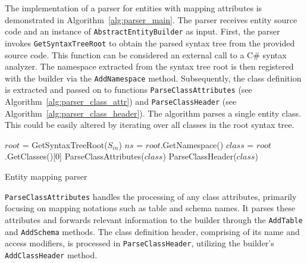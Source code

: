 The implementation of a parser for entities with mapping attributes is demonstrated in Algorithm~\ref{alg:parser_main}. The parser receives entity source code and an instance of \texttt{AbstractEntityBuilder} as input. First, the parser invokes \texttt{GetSyntaxTreeRoot} to obtain the parsed syntax tree from the provided source code. This function can be considered an external call to a C\# syntax analyzer. The namespace extracted from the syntax tree root is then registered with the builder via the \texttt{AddNamespace} method. Subsequently, the class definition is extracted and passed on to functions \texttt{ParseClassAttributes} (see Algorithm~\ref{alg:parser_class_attr}) and \texttt{ParseClassHeader} (see Algorithm~\ref{alg:parser_class_header}). The algorithm parses a single entity class. This could be easily altered by iterating over all classes in the root syntax tree.

\begin{algorithm}[!htp]
    \small
    \DontPrintSemicolon
    
    
    $root$ = GetSyntaxTreeRoot($S_{in}$)\;
    \BlankLine
    $ns$ = $root$.GetNamespace()\;
    \BlankLine
    $class$ = $root$.GetClasses()[0]\;
    ParseClassAttributes($class$)\;
    ParseClassHeader($class$)\;
    
    \caption{Entity mapping parser}
    \label{alg:parser_main}
\end{algorithm}


\texttt{ParseClassAttributes} handles the processing of any class attributes, primarily focusing on mapping notations such as table and schema names. It parses these attributes and forwards relevant information to the builder through the \texttt{AddTable} and \texttt{AddSchema} methods. The class definition header, comprising of its name and access modifiers, is processed in \texttt{ParseClassHeader}, utilizing the builder's \texttt{AddClassHeader} method.

